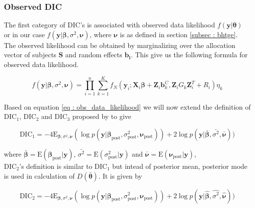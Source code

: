 \subsubsection{Observed DIC}
The first category of DIC's is associated with observed data likelihood $f(\boldsymbol{y}|\boldsymbol{\theta})$ or in our case $f(\boldsymbol{y}|\boldsymbol{\beta}, \sigma^2, \boldsymbol{\nu})$, where $\boldsymbol{\nu}$ is as defined in section \ref{subsec : bhtge}. The observed likelihood can be obtained by marginalizing over the allocation vector of subjects $\boldsymbol{S}$ and random effects $\boldsymbol{b_i}$. This give us the following formula for observed data likelihood.

\begin{equation}
\label{eq : obs_data_likelihood}
f(\boldsymbol{y}|\boldsymbol{\beta}, \sigma^2, \boldsymbol{\nu}) = \prod_{i=1}^n \sum_{k=1}^K f_N(\boldsymbol{y}_i; \boldsymbol{X}_i\boldsymbol{\beta} + \boldsymbol{Z}_i \boldsymbol{b}_k^C, \boldsymbol{Z}_{i} G_k \boldsymbol{Z}_{i}^T+ R_i) \eta_k
\end{equation}
 
Based on equation \ref{eq : obs_data_likelihood} we will now extend the definition of $\text{DIC}_1$, $\text{DIC}_2$ and $\text{DIC}_3$ proposed by \citet{celeux_deviance_2006} to give

\begin{equation}
\label{eq : DIC1}
\text{DIC}_1 = -4\text{E}_{\boldsymbol{\beta}, \sigma^2, \boldsymbol{\nu}} (\log{p(\boldsymbol{y}|\boldsymbol{\beta}_{\text{post}}, \sigma^2_{\text{post}}, \boldsymbol{\nu}_{\text{post}})}) + 2\log{p(\boldsymbol{y}|\boldsymbol{\bar{\beta}}, \bar{\sigma^2}, \boldsymbol{\bar{\nu}})})
\end{equation}

where 
$\boldsymbol{\bar{\beta}}=\text{E}(\boldsymbol{\beta}_{\text{post}}|\boldsymbol{y})$, 
$\bar{\sigma^2}=\text{E}(\sigma^2_{\text{post}}|\boldsymbol{y})$ and 
$\boldsymbol{\bar{\nu}}=\text{E}(\boldsymbol{\nu}_{\text{post}}|\boldsymbol{y})$,\\

$\text{DIC}_2$'s definition is similar to $\text{DIC}_1$ but intead of posterior mean, posterior mode is used in calculation of $D(\boldsymbol{\bar{\theta}})$. It is given by

\begin{equation}
\label{eq : DIC2}
\text{DIC}_2 = -4\text{E}_{\boldsymbol{\beta}, \sigma^2, \boldsymbol{\nu}}(\log{p(\boldsymbol{y}|\boldsymbol{\beta}_{\text{post}}, \sigma^2_{\text{post}}, \boldsymbol{\nu}_{\text{post}})}) + 2\log{p(\boldsymbol{y}|\boldsymbol{\hat{\beta}}, \hat{\sigma^2}, \boldsymbol{\hat{\nu}})})
\end{equation}

